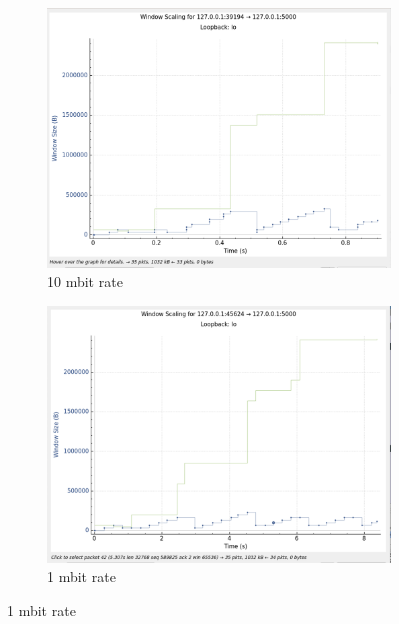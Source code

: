 \documentclass{report}
\begin{document}
\begin{figure}[H]
    \centering
    \begin{subfigure}[b]{0.45\textwidth}
        \centering
        \includegraphics[width=\textwidth]{Pics/Vegas/r10mbit_s1m_ws}
        \caption{10 mbit rate }
    \end{subfigure}
    \hfill
    \begin{subfigure}[b]{0.45\textwidth}
        \centering
        \includegraphics[width=\textwidth]{Pics/Vegas/r1mbit_s1m_ws}
        \caption{1 mbit rate}
    \end{subfigure}
    \medskip


\end{figure}
\end{document}
